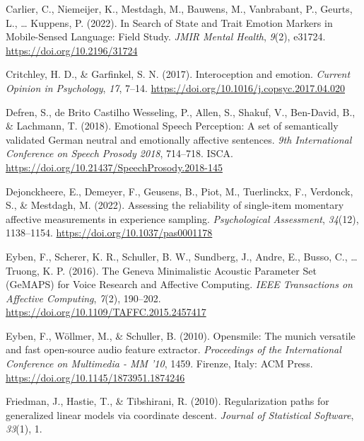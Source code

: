 \documentclass[
  man,floatsintext]{apa6}
\newlength{\cslhangindent}
\newlength{\cslentryspacingunit} %
\newenvironment{CSLReferences}[2] %
 {%
  \setlength{\parindent}{0pt}
  \ifodd #1
  \let\oldpar\par
  \def\par{\hangindent=\cslhangindent\oldpar}
  \fi
  \setlength{\parskip}{#2\cslentryspacingunit}
 }%
 {}
\begin{document}
\begin{CSLReferences}{1}{0}
\leavevmode{}%
Carlier, C., Niemeijer, K., Mestdagh, M., Bauwens, M., Vanbrabant, P., Geurts, L., \ldots{} Kuppens, P. (2022). In {Search} of {State} and {Trait Emotion Markers} in {Mobile-Sensed Language}: {Field Study}. \emph{JMIR Mental Health}, \emph{9}(2), e31724. \url{https://doi.org/10.2196/31724}

\leavevmode{}%
Critchley, H. D., \& Garfinkel, S. N. (2017). Interoception and emotion. \emph{Current Opinion in Psychology}, \emph{17}, 7--14. \url{https://doi.org/10.1016/j.copsyc.2017.04.020}

\leavevmode{}%
Defren, S., de Brito Castilho Wesseling, P., Allen, S., Shakuf, V., Ben-David, B., \& Lachmann, T. (2018). Emotional {Speech Perception}: {A} set of semantically validated {German} neutral and emotionally affective sentences. \emph{9th {International Conference} on {Speech Prosody} 2018}, 714--718. {ISCA}. \url{https://doi.org/10.21437/SpeechProsody.2018-145}

\leavevmode{}%
Dejonckheere, E., Demeyer, F., Geusens, B., Piot, M., Tuerlinckx, F., Verdonck, S., \& Mestdagh, M. (2022). Assessing the reliability of single-item momentary affective measurements in experience sampling. \emph{Psychological Assessment}, \emph{34}(12), 1138--1154. \url{https://doi.org/10.1037/pas0001178}

\leavevmode{}%
Eyben, F., Scherer, K. R., Schuller, B. W., Sundberg, J., Andre, E., Busso, C., \ldots{} Truong, K. P. (2016). The {Geneva Minimalistic Acoustic Parameter Set} ({GeMAPS}) for {Voice Research} and {Affective Computing}. \emph{IEEE Transactions on Affective Computing}, \emph{7}(2), 190--202. \url{https://doi.org/10.1109/TAFFC.2015.2457417}

\leavevmode{}%
Eyben, F., Wöllmer, M., \& Schuller, B. (2010). Opensmile: The munich versatile and fast open-source audio feature extractor. \emph{Proceedings of the International Conference on {Multimedia} - {MM} '10}, 1459. {Firenze, Italy}: {ACM Press}. \url{https://doi.org/10.1145/1873951.1874246}

\leavevmode{}%
Friedman, J., Hastie, T., \& Tibshirani, R. (2010). Regularization paths for generalized linear models via coordinate descent. \emph{Journal of Statistical Software}, \emph{33}(1), 1.


\end{CSLReferences}
\end{document}
